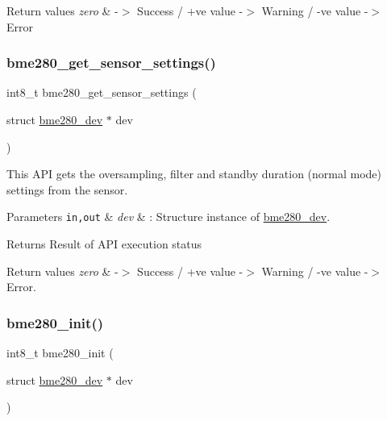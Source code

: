 \begin{DoxyRetVals}{Return values}
{\em zero} & -\/$>$ Success / +ve value -\/$>$ Warning / -\/ve value -\/$>$ Error \\
\hline
\end{DoxyRetVals}
\mbox{\label{group___b_m_e280_gaf3bef90d33942197a98715ea8657211f}} 
\subsubsection{\texorpdfstring{bme280\+\_\+get\+\_\+sensor\+\_\+settings()}{bme280\_get\_sensor\_settings()}}
{\footnotesize\ttfamily int8\+\_\+t bme280\+\_\+get\+\_\+sensor\+\_\+settings (\begin{DoxyParamCaption}\item[{struct \hyperlink{structbme280__dev}{bme280\+\_\+dev} $\ast$}]{dev }\end{DoxyParamCaption})}



This A\+PI gets the oversampling, filter and standby duration (normal mode) settings from the sensor. 


\begin{DoxyParams}[1]{Parameters}
\mbox{\tt in,out}  & {\em dev} & \+: Structure instance of \hyperlink{structbme280__dev}{bme280\+\_\+dev}.\\
\hline
\end{DoxyParams}
\begin{DoxyReturn}{Returns}
Result of A\+PI execution status 
\end{DoxyReturn}

\begin{DoxyRetVals}{Return values}
{\em zero} & -\/$>$ Success / +ve value -\/$>$ Warning / -\/ve value -\/$>$ Error. \\
\hline
\end{DoxyRetVals}
\mbox{\label{group___b_m_e280_gaf0b7d7a19bb48ec9eb3651b79f0c3e85}} 
\subsubsection{\texorpdfstring{bme280\+\_\+init()}{bme280\_init()}}
{\footnotesize\ttfamily int8\+\_\+t bme280\+\_\+init (\begin{DoxyParamCaption}\item[{struct \hyperlink{structbme280__dev}{bme280\+\_\+dev} $\ast$}]{dev }\end{DoxyParamCaption})}



